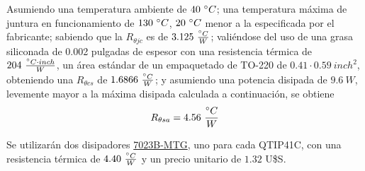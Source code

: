 Asumiendo una temperatura ambiente de $40 \ \degree C$; una temperatura máxima de juntura en funcionamiento de $130 \ \degree C$, $20 \ \degree C$ menor a la especificada por el fabricante; sabiendo que la $R_{\theta jc}$ es de $3.125 \ \frac{\degree C}{W}$; valiéndose del uso de una grasa siliconada de 0.002 pulgadas de espesor con una resistencia térmica de $204 \ \frac{\degree C \cdot inch}{W}$, un área estándar de un empaquetado de TO-220 de $0.41\cdot 0.59 \ inch^2$, obteniendo una $R_{\theta cs}$ de $1.6866 \ \frac{\degree C}{W}$; y asumiendo  una potencia disipada de $9.6 \ W$, levemente mayor a la máxima disipada calculada a continuación, se obtiene
\begin{equation}
R_{\theta sa} = 4.56 \ \frac{\degree C}{W}
\end{equation}

Se utilizarán dos disipadores \href{https://www.digikey.com/product-detail/en/aavid-thermal-division-of-boyd-corporation/7023B-MTG/HS410-ND/1625509}{7023B-MTG}, uno para cada QTIP41C, con una resistencia térmica de $4.40 \ \frac{\degree C}{W}$ y un precio unitario de $1.32$ U\$S.



